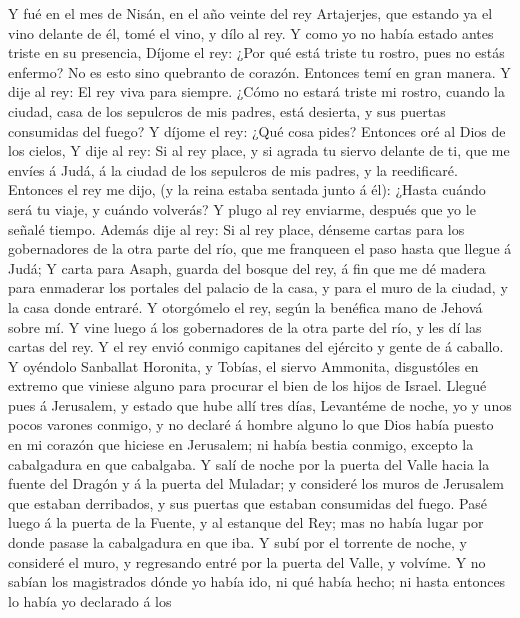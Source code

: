  Y fué en el mes de Nisán, en el año veinte del rey
Artajerjes, que estando ya el vino delante de él, tomé el vino, y dílo
al rey. Y como yo no había estado antes triste en su presencia,
 Díjome el rey: ¿Por qué está triste tu rostro, pues no
estás enfermo? No es esto sino quebranto de corazón. Entonces temí en
gran manera.  Y dije al rey: El rey viva para siempre.
¿Cómo no estará triste mi rostro, cuando la ciudad, casa de los
sepulcros de mis padres, está desierta, y sus puertas consumidas del
fuego?  Y díjome el rey: ¿Qué cosa pides? Entonces oré al
Dios de los cielos,  Y dije al rey: Si al rey place, y si
agrada tu siervo delante de ti, que me envíes á Judá, á la ciudad de los
sepulcros de mis padres, y la reedificaré.  Entonces el
rey me dijo, (y la reina estaba sentada junto á él): ¿Hasta cuándo será
tu viaje, y cuándo volverás? Y plugo al rey enviarme, después que yo le
señalé tiempo.  Además dije al rey: Si al rey place,
dénseme cartas para los gobernadores de la otra parte del río, que me
franqueen el paso hasta que llegue á Judá;  Y carta para
Asaph, guarda del bosque del rey, á fin que me dé madera para enmaderar
los portales del palacio de la casa, y para el muro de la ciudad, y la
casa donde entraré. Y otorgómelo el rey, según la benéfica mano de
Jehová sobre mí.  Y vine luego á los gobernadores de la
otra parte del río, y les dí las cartas del rey. Y el rey envió conmigo
capitanes del ejército y gente de á caballo.  Y oyéndolo
Sanballat Horonita, y Tobías, el siervo Ammonita, disgustóles en extremo
que viniese alguno para procurar el bien de los hijos de Israel.
 Llegué pues á Jerusalem, y estado que hube allí tres
días,  Levantéme de noche, yo y unos pocos varones
conmigo, y no declaré á hombre alguno lo que Dios había puesto en mi
corazón que hiciese en Jerusalem; ni había bestia conmigo, excepto la
cabalgadura en que cabalgaba.  Y salí de noche por la
puerta del Valle hacia la fuente del Dragón y á la puerta del Muladar; y
consideré los muros de Jerusalem que estaban derribados, y sus puertas
que estaban consumidas del fuego.  Pasé luego á la puerta
de la Fuente, y al estanque del Rey; mas no había lugar por donde pasase
la cabalgadura en que iba.  Y subí por el torrente de
noche, y consideré el muro, y regresando entré por la puerta del Valle,
y volvíme.  Y no sabían los magistrados dónde yo había
ido, ni qué había hecho; ni hasta entonces lo había yo declarado á los
